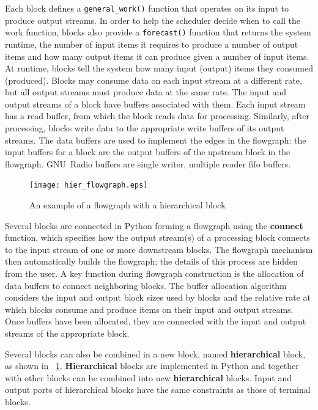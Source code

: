 Each block defines a \texttt{general\_work()} function that operates on its input to produce output streams. In order to help the scheduler decide when to call the work function, blocks also provide a \texttt{forecast()} function that returns the system runtime, the number of input items it requires to produce a number of output items and how many output items it can produce given a number of input items. At runtime, blocks tell the system how many input (output) items they consumed (produced). Blocks may consume data on each input stream at a different rate, but all output streams must produce data at the same rate. The input and output streams of a block have buffers associated with them. Each input stream has a read buffer, from which the block reads data for processing. Similarly, after processing, blocks write data to the appropriate write buffers of its output streams. The data buffers are used to implement the edges in the flowgraph: the input buffers for a block are the output buffers of the upstream block in the flowgraph. GNU~Radio buffers are single writer, multiple reader \gls{fifo} buffers.
%
\begin{figure}[thb]
\centering
\texttt{[image: hier\_flowgraph.eps]}
\caption{An example of a flowgraph with a hierarchical block}\label{fig:hier_flowgraph}
\end{figure}
%
Several blocks are connected in Python forming a flowgraph using the \textbf{connect} function, which specifies how the output stream(s) of a processing block connects to the input stream of one or more downstream blocks. The flowgraph mechanism then automatically builds the flowgraph; the details of this process are hidden from the user. A key function during flowgraph construction is the allocation of data buffers to connect neighboring blocks. The buffer allocation algorithm considers the input and output block sizes used by blocks and the relative rate at which blocks consume and produce items on their input and output streams. Once buffers have been allocated, they are connected with the input and output streams of the appropriate block.

Several blocks can also be combined in a new block, named \textbf{hierarchical} block, as shown in ~\cref{fig:hier_flowgraph}. \textbf{Hierarchical} blocks are implemented in Python and together with other blocks can be combined into new \textbf{hierarchical} blocks. Input and output ports of hierarchical blocks have the same constraints as those of terminal blocks.

